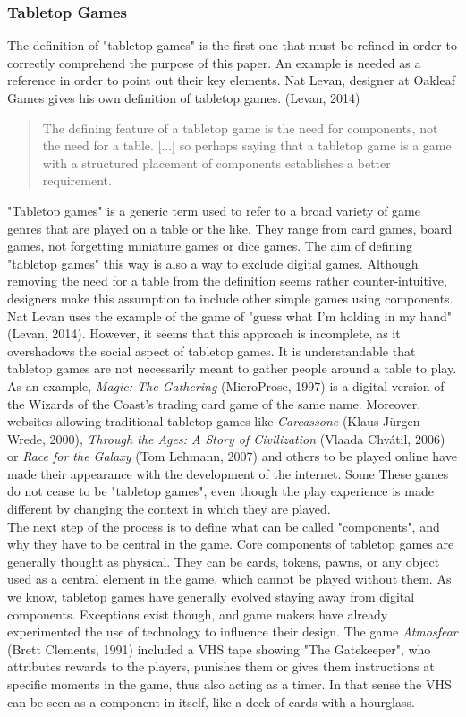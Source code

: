 \subsubsection{Tabletop Games}
The definition of "tabletop games" is the first one that must be refined in order to correctly comprehend the purpose of this paper. An example is needed as a reference in order to point out their key elements. Nat Levan, designer at Oakleaf Games gives his own definition of tabletop games. (Levan, 2014)
\begin{quotation}
The defining feature of a tabletop game is the need for components, not the need for a table. [...] so perhaps saying that a tabletop game is a game with a structured placement of components establishes a better requirement.
\end{quotation} 
"Tabletop games" is a generic term used to refer to a broad variety of game genres that are played on a table or the like. They range from card games, board games, not forgetting miniature games or dice games. The aim of defining "tabletop games" this way is also a way to exclude digital games. Although removing the need for a table from the definition seems rather counter-intuitive, designers make this assumption to include other simple games using components. Nat Levan uses the example of the game of "guess what I’m holding in my hand"(Levan, 2014). However, it seems that this approach is incomplete, as it overshadows the social aspect of tabletop games. It is understandable that tabletop games are not necessarily meant to gather people around a table to play. As an example, \textit{Magic: The Gathering} (MicroProse, 1997) is a digital version of the Wizards of the Coast’s trading card game of the same name. Moreover, websites allowing traditional tabletop games like \textit{Carcassone} (Klaus-Jürgen Wrede, 2000), \textit{Through the Ages: A Story of Civilization} (Vlaada Chvátil, 2006) or \textit{Race for the Galaxy} (Tom Lehmann, 2007) and others to be played online have made their appearance with the development of the internet. Some These games do not cease to be "tabletop games", even though the play experience is made different by changing the context in which they are played.\\
The next step of the process is to define what can be called "components", and why they have to be central in the game. Core components of tabletop games are generally thought as physical. They can be cards, tokens, pawns, or any object used as a central element in the game, which cannot be played without them.  As we know, tabletop games have generally evolved staying away from digital components. Exceptions exist though, and game makers have already experimented the use of technology to influence their design. The game \textit{Atmosfear} (Brett Clements, 1991) included a VHS tape showing "The Gatekeeper", who attributes rewards to the players, punishes them or gives them instructions at specific moments in the game, thus also acting as a timer. In that sense the VHS can be seen as a component in itself, like a deck of cards with a hourglass. 
